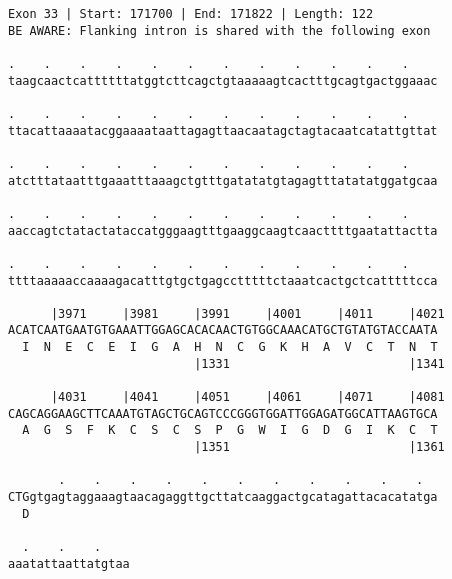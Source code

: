 \documentclass{article}
\begin{document}
\begin{Verbatim}
Exon 33 | Start: 171700 | End: 171822 | Length: 122
BE AWARE: Flanking intron is shared with the following exon
 
.    .    .    .    .    .    .    .    .    .    .    .    
taagcaactcattttttatggtcttcagctgtaaaaagtcactttgcagtgactggaaac
  
.    .    .    .    .    .    .    .    .    .    .    .    
ttacattaaaatacggaaaataattagagttaacaatagctagtacaatcatattgttat
  
.    .    .    .    .    .    .    .    .    .    .    .    
atctttataatttgaaatttaaagctgtttgatatatgtagagtttatatatggatgcaa
  
.    .    .    .    .    .    .    .    .    .    .    .    
aaccagtctatactataccatgggaagtttgaaggcaagtcaacttttgaatattactta
  
.    .    .    .    .    .    .    .    .    .    .    .    
ttttaaaaaccaaaagacatttgtgctgagcctttttctaaatcactgctcatttttcca
  
      |3971     |3981     |3991     |4001     |4011     |4021
ACATCAATGAATGTGAAATTGGAGCACACAACTGTGGCAAACATGCTGTATGTACCAATA
  I  N  E  C  E  I  G  A  H  N  C  G  K  H  A  V  C  T  N  T
                          |1331                         |1341
  
      |4031     |4041     |4051     |4061     |4071     |4081
CAGCAGGAAGCTTCAAATGTAGCTGCAGTCCCGGGTGGATTGGAGATGGCATTAAGTGCA
  A  G  S  F  K  C  S  C  S  P  G  W  I  G  D  G  I  K  C  T
                          |1351                         |1361
  
       .    .    .    .    .    .    .    .    .    .    .  
CTGgtgagtaggaaagtaacagaggttgcttatcaaggactgcatagattacacatatga
  D                                                         
  
  .    .    .    
aaatattaattatgtaa
\end{Verbatim}
\newpage
\end{document}
